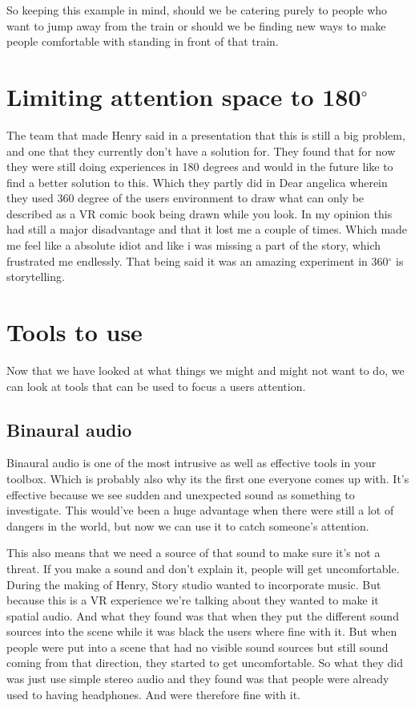 \documentclass{report}
\begin{document}
				So keeping this example in mind, should we be catering purely to people who want to jump away from the train or should we be finding new ways to make people comfortable with standing in front of that train.
				
				\section{Limiting attention space to 180$^{\circ}$}
				The team that made Henry said in a presentation that this is  still a big problem, and one that they currently don't have a solution for. They found that for now they were still doing experiences in 180 degrees and would in the future like to find a better solution to this. Which they partly did in Dear angelica wherein they used 360 degree of the users environment to draw what can only be described as a VR comic book being drawn while you look. In my opinion this had still a major disadvantage and that it lost me a couple of times. Which made me feel like a absolute idiot and like i was missing a part of the story, which frustrated me endlessly. That being said it was an amazing experiment in 360$^{\circ}$ is storytelling.
				
				\section{Tools to use}
			
				Now that we have looked at what things we might and might not want to do, we can look at tools that can be used to focus a users attention.
				
				
				\subsection{Binaural audio}
				Binaural audio is one of the most intrusive as well as effective tools in your toolbox. Which is probably also why its the first one everyone comes up with. It's effective because we see sudden and unexpected sound as something to investigate. This would've been a huge advantage when there were still a lot of dangers in the world, but now we can use it to catch someone's attention.
				
				This also means that we need a source of that sound to make sure it's not a threat. If you make a sound and don't explain it, people will get uncomfortable. During the making of Henry, Story studio wanted to incorporate music. But because this is a VR experience we're talking about they wanted to make it spatial audio. And what they found was that when they put the different sound sources into the scene while it was black the users where fine with it. But when people were put into a scene that had no visible sound sources but still sound coming from that direction, they started to get uncomfortable. So what they did was just use simple stereo audio and they found was that people were already used to having headphones. And were therefore fine with it.
				
\end{document}
